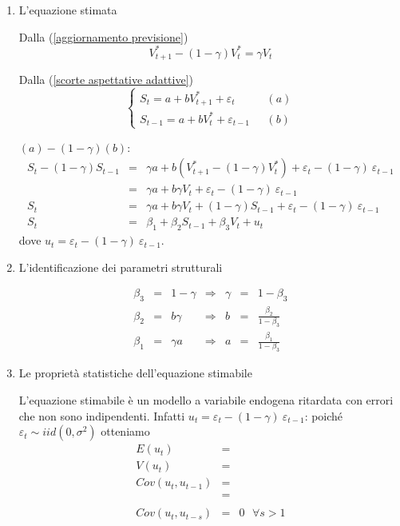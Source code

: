 \documentclass[a4paper]{report}
\theoremstyle{remark}
\begin{document}
\begin{enumerate}
\item L'equazione stimata

Dalla (\ref{aggiornamento previsione})%
\begin{equation*}
V_{t+1}^{\ast }-(1-\gamma )V_{t}^{\ast }=\gamma V_{t}
\end{equation*}

Dalla (\ref{scorte aspettative adattive})%
\begin{equation*}
\left\{ 
\begin{array}{cc}
S_{t}=a+bV_{t+1}^{\ast }+\varepsilon _{t} & \ \ \ (a) \\ 
S_{t-1}=a+bV_{t}^{\ast }+\varepsilon _{t-1} & \ \ \ (b)%
\end{array}%
\right.
\end{equation*}

$(a)-(1-\gamma )(b)$:%
\begin{eqnarray*}
S_{t}-(1-\gamma )S_{t-1} &=&\gamma a+b(V_{t+1}^{\ast }-(1-\gamma
)V_{t}^{\ast })+\varepsilon _{t}-(1-\gamma )\ \varepsilon _{t-1} \\
&=&\gamma a+b\gamma V_{t}+\varepsilon _{t}-(1-\gamma )\ \varepsilon _{t-1} \\
S_{t} &=&\gamma a+b\gamma V_{t}+(1-\gamma )S_{t-1}+\varepsilon
_{t}-(1-\gamma )\ \varepsilon _{t-1} \\
S_{t} &=&\beta _{1}+\beta _{2}S_{t-1}+\beta _{3}V_{t}+u_{t}
\end{eqnarray*}%
dove $u_{t}=\varepsilon _{t}-(1-\gamma )\ \varepsilon _{t-1}$.

\item L'identificazione dei parametri strutturali

\begin{equation*}
\begin{array}{ccccccc}
\beta _{3} & = & 1-\gamma & \Rightarrow & \gamma & = & 1-\beta _{3} \\ 
\beta _{2} & = & b\gamma & \Rightarrow & b & = & \frac{\beta _{2}}{1-\beta
_{3}} \\ 
\beta _{1} & = & \gamma a & \Rightarrow & a & = & \frac{\beta _{1}}{1-\beta
_{3}}%
\end{array}%
\end{equation*}

\item Le propriet\`{a} statistiche dell'equazione stimabile

L'equazione stimabile \`{e} un modello a variabile endogena ritardata con
errori che non sono indipendenti. Infatti $u_{t}=\varepsilon _{t}-(1-\gamma
)\ \varepsilon _{t-1}$: poich\'{e} $\varepsilon _{t}\sim iid(0,\sigma ^{2})$
otteniamo%
\begin{eqnarray*}
E(u_{t}) &=& \\
V(u_{t}) &=& \\
Cov(u_{t},u_{t-1}) &=& \\
&=& \\
&& \\
Cov(u_{t},u_{t-s}) &=&0\text{ \ \ \ \ \ \ }\forall s>1
\end{eqnarray*}
\end{enumerate}
\end{document}
